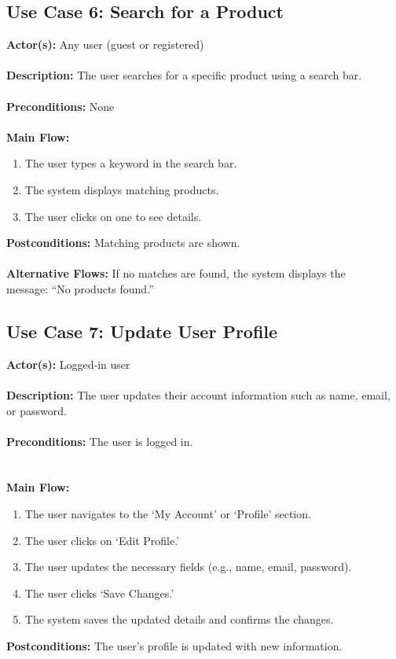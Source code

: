 \documentclass[a4paper,12pt]{article}
\begin{document}
	\subsection*{Use Case 6: Search for a Product}
	\textbf{Actor(s):} Any user (guest or registered) \\ \\
	\textbf{Description:} The user searches for a specific product using a search bar. \\ \\
	\textbf{Preconditions:} None \\ \\
	\textbf{Main Flow:}
	\begin{enumerate}
  		\item The user types a keyword in the search bar.
  		\item The system displays matching products.
  		\item The user clicks on one to see details.
	\end{enumerate}
	\textbf{Postconditions:} Matching products are shown. \\ \\
	\textbf{Alternative Flows:} If no matches are found, the system displays the \\ message: ``No products
	found.''


	\subsection*{Use Case 7: Update User Profile}
	\textbf{Actor(s):} Logged-in user \\ \\
	\textbf{Description:} The user updates their account information such as name, email, or password. \\ \\
	\textbf{Preconditions:} The user is logged in. \\ \\ \\
	\textbf{Main Flow:}
	\begin{enumerate}
	\item The user navigates to the `My Account' or `Profile' section.
	\item The user clicks on `Edit Profile.'
	\item The user updates the necessary fields (e.g., name, email, password).
	\item The user clicks `Save Changes.'
	\item The system saves the updated details and confirms the changes.
	\end{enumerate}
	\textbf{Postconditions:} The user's profile is updated with new information.
\end{document}
